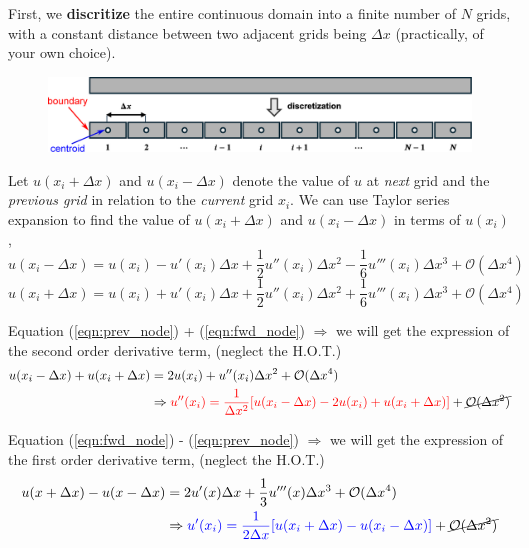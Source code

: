 \documentclass[a4paper]{article}
\begin{document}
\begin{tcolorbox}[title = Numerical Solution Procedure, breakable]
First, we \textbf{discritize} the entire continuous domain into a finite number of $N$ grids, with a constant distance between two adjacent grids being $\Delta x$ (practically, of your own choice). 
\begin{figure}[H]
    \centering
    \includegraphics[width=.9\textwidth]{img/discretize.eps}
\end{figure}

Let $u(x_i + \Delta x)$ and $u(x_i - \Delta x)$ denote the value of $u$ at \textit{next} grid and the \textit{previous grid} in relation to the \textit{current} grid $x_i$. We can use Taylor series expansion to find the value of $u(x_i + \Delta x)$ and $u(x_i-\Delta x)$ in terms of $u(x_i)$,
\begin{equation}
\label{eqn:prev_node}
    u(x_i-\Delta x) = u(x_i) - u'(x_i)\Delta  x + \frac{1}{2}u''(x_i)\Delta  x^2 - \frac{1}{6}u'''(x_i)\Delta  x^3 + \mathcal{O}(\Delta  x^4)
\end{equation}
\begin{equation}
\label{eqn:fwd_node}
    u(x_i+\Delta x) = u(x_i) + u'(x_i)\Delta  x + \frac{1}{2}u''(x_i)\Delta  x^2 + \frac{1}{6}u'''(x_i)\Delta  x^3 + \mathcal{O}(\Delta x^4)
\end{equation}

Equation (\ref{eqn:prev_node}) + (\ref{eqn:fwd_node}) $\Rightarrow$ we will get the expression of the second order derivative term, (neglect the H.O.T.)
\begin{align*} 
    u(x_i-\Delta  x) + u(x_i+\Delta  x) & = 2 u(x_i) + u''(x_i) \Delta x^2 + \mathcal{O}(\Delta x^4) \\
    & \Rightarrow {\color{red} u''(x_i) = \frac{1}{\Delta x^2} [u(x_i-\Delta x) - 2u(x_i) + u(x_i+\Delta x)]} + \cancel{\mathcal{O}(\Delta x^2)}
\end{align*}

Equation (\ref{eqn:fwd_node}) - (\ref{eqn:prev_node}) $\Rightarrow$ we will get the expression of the first order derivative term, (neglect the H.O.T.)
\begin{align*}
    u(x+\Delta  x) - u(x-\Delta  x) & = 2 u'(x)\Delta x + \frac{1}{3}u'''(x) \Delta x^3 + \mathcal{O}(\Delta x^4) \\
    & \Rightarrow {\color{blue} u'(x_i) = \frac{1}{2\Delta x} [u(x_i+\Delta x) - u(x_i-\Delta x)]} + \cancel{\mathcal{O}(\Delta x^2)}
\end{align*}


\end{tcolorbox}
\end{document}
